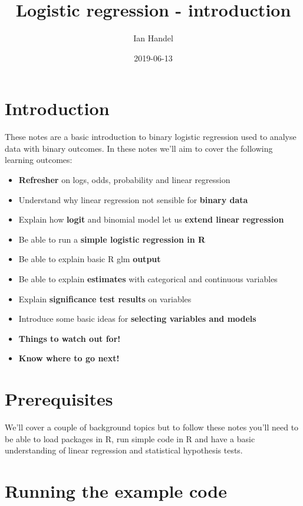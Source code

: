 \documentclass[]{tufte-handout}
\title{Logistic regression - introduction}
\author{Ian Handel}
\date{2019-06-13}
\providecommand{\tightlist}{%
  \setlength{\itemsep}{0pt}\setlength{\parskip}{0pt}}
\begin{document}
\maketitle




\hypertarget{introduction}{%
\section{Introduction}\label{introduction}}

These notes are a basic introduction to binary logistic regression used
to analyse data with binary outcomes. In these notes we'll aim to cover
the following learning outcomes:

\begin{itemize}
\tightlist
\item
  \textbf{Refresher} on logs, odds, probability and linear regression
\item
  Understand why linear regression not sensible for \textbf{binary data}
\item
  Explain how \textbf{logit} and binomial model let us \textbf{extend
  linear regression}
\item
  Be able to run a \textbf{simple logistic regression in R}
\item
  Be able to explain basic R glm \textbf{output}
\item
  Be able to explain \textbf{estimates} with categorical and continuous
  variables
\item
  Explain \textbf{significance test results} on variables
\item
  Introduce some basic ideas for \textbf{selecting variables and models}
\item
  \textbf{Things to watch out for!}
\item
  \textbf{Know where to go next!}
\end{itemize}

\hypertarget{prerequisites}{%
\section{Prerequisites}\label{prerequisites}}

We'll cover a couple of background topics but to follow these notes
you'll need to be able to load packages in R, run simple code in R and
have a basic understanding of linear regression and statistical
hypothesis tests.

\hypertarget{running-the-example-code}{%
\section{Running the example code}\label{running-the-example-code}}
\end{document}
